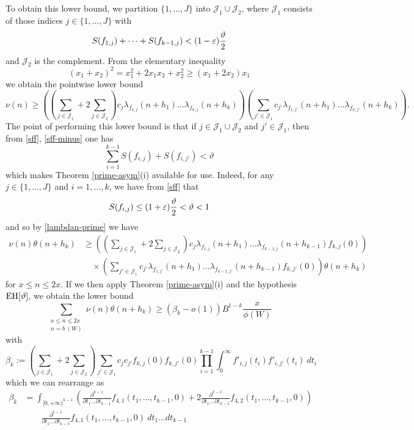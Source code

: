 To obtain this lower bound, we partition $\{1,\dots,J\}$ into ${\mathcal J}_1 \cup {\mathcal J}_2$, where ${\mathcal J}_1$ consists of those indices $j \in \{1,\dots,J\}$ with
\begin{equation}\label{sff-minus}
S(f_{1,j}) + \dots + S(f_{k-1,j}) < (1-\varepsilon) \frac{\vartheta}{2}
\end{equation}
and ${\mathcal J}_2$ is the complement.  From the elementary inequality
$$ (x_1 + x_2)^2 = x_1^2 + 2x_1 x_2 + x_2^2 \geq (x_1+2x_2) x_1 $$
we obtain the pointwise lower bound
$$ \nu(n) \geq 
\left( (\sum_{j \in {\mathcal J}_1} + 2 \sum_{j \in {\mathcal J}_2}) c_j \lambda_{f_{1,j}}(n+h_1) \dots \lambda_{f_{k,j}}(n+h_k) \right)
\left( \sum_{j' \in {\mathcal J}_1} c_{j'} \lambda_{f_{1,j'}}(n+h_1) \dots \lambda_{f_{k,j'}}(n+h_k) \right).$$
The point of performing this lower bound is that if $j \in {\mathcal J}_1 \cup {\mathcal J}_2$ and $j' \in {\mathcal J}_1$, then from \eqref{sff}, \eqref{sff-minus} one has
$$ \sum_{i=1}^{k-1} S(f_{i,j}) + S(f_{i,j'}) < \vartheta$$
which makes Theorem \ref{prime-asym}(i) available for use.  Indeed, for any $j \in \{1,\dots,J\}$ and $i=1,\dots,k$, we have from \eqref{sff} that
$$ S(f_{i,j}) \leq (1+\varepsilon) \frac{\vartheta}{2} < \vartheta < 1$$
and so by \eqref{lambdan-prime} we have
\begin{equation}\label{nutheta}
\begin{split}
 \nu(n) \theta(n+h_k) &\geq 
\left( (\sum_{j \in {\mathcal J}_1} + 2 \sum_{j \in {\mathcal J}_2}) c_j \lambda_{f_{1,j}}(n+h_1) \dots \lambda_{f_{k-1,j}}(n+h_{k-1}) f_{k,j}(0) \right)\\
&\quad \times \left( \sum_{j' \in {\mathcal J}_1} c_{j'} \lambda_{f_{1,j'}}(n+h_1) \dots \lambda_{f_{k-1,j'}}(n+h_{k-1}) f_{k,j'}(0) \right) \theta(n+h_k)
\end{split}
\end{equation}
for $x \leq n \leq 2x$.  If we then apply Theorem \ref{prime-asym}(i) and the hypothesis $\operatorname*{EH}[\vartheta]$, we obtain the lower bound
$$ 
 \sum_{\substack{x \leq n \leq 2x\\ n = b\ (W)}} \nu(n) \theta(n+h_k) \geq (\beta_k - o(1)) B^{1-k} \frac{x}{\phi(W)}$$
with
$$ \beta_k :=
(\sum_{j \in {\mathcal J}_1} + 2 \sum_{j \in {\mathcal J}_2}) \sum_{j' \in {\mathcal J}_1} c_j c_{j'} f_{k,j}(0) f_{k,j'}(0)
\prod_{i=1}^{k-1} \int_0^\infty f'_{i,j}(t_i) f'_{i,j'}(t_i)\ dt_i $$
which we can rearrange as
\begin{align*}
\beta_k &= \int_{[0,+\infty)^{k-1}} \left(\frac{\partial^{k-1}}{\partial t_1 \dots \partial t_{k-1}} f_{4,1}(t_1,\dots,t_{k-1},0) + 2\frac{\partial^{k-1}}{\partial t_1 \dots \partial t_{k-1}} f_{4,2}(t_1,\dots,t_{k-1},0)\right)\\
&\quad\quad  \frac{\partial^{k-1}}{\partial t_1 \dots \partial t_{k-1}} f_{4,1}(t_1,\dots,t_{k-1},0)\ dt_1 \dots dt_{k-1} 
\end{align*}
